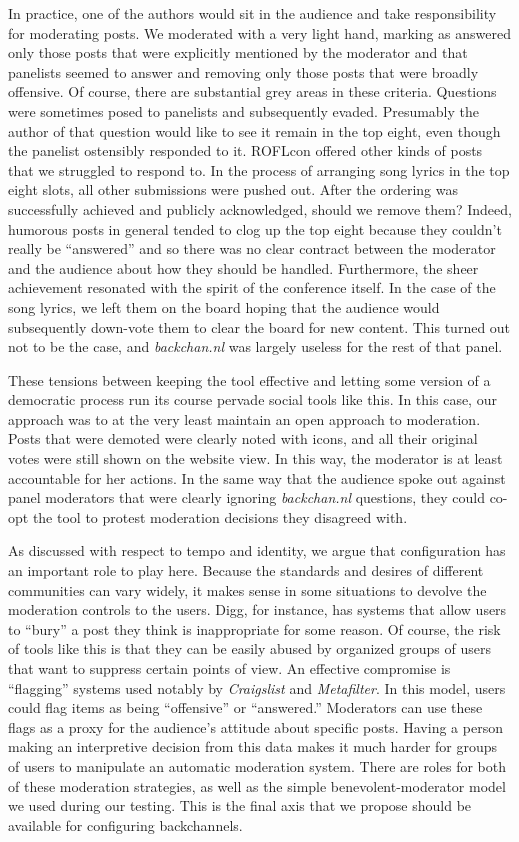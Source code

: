 In practice, one of the authors would sit in the audience and take responsibility for moderating posts. We moderated with a very light hand, marking as answered only those posts that were explicitly mentioned by the moderator and that panelists seemed to answer and removing only those posts that were broadly offensive. Of course, there are substantial grey areas in these criteria. Questions were sometimes posed to panelists and subsequently evaded. Presumably the author of that question would like to see it remain in the top eight, even though the panelist ostensibly responded to it. ROFLcon offered other kinds of posts that we struggled to respond to. In the process of arranging song lyrics in the top eight slots, all other submissions were pushed out. After the ordering was successfully achieved and publicly acknowledged, should we remove them? Indeed, humorous posts in general tended to clog up the top eight because they couldn't really be ``answered'' and so there was no clear contract between the moderator and the audience about how they should be handled. Furthermore, the sheer achievement resonated with the spirit of the conference itself. In the case of the song lyrics, we left them on the board hoping that the audience would subsequently down-vote them to clear the board for new content. This turned out not to be the case, and \emph{backchan.nl} was largely useless for the rest of that panel.

These tensions between keeping the tool effective and letting some version of a democratic process run its course pervade social tools like this. In this case, our approach was to at the very least maintain an open approach to moderation. Posts that were demoted were clearly noted with icons, and all their original votes were still shown on the website view. In this way, the moderator is at least accountable for her actions. In the same way that the audience spoke out against panel moderators that were clearly ignoring \emph{backchan.nl} questions, they could co-opt the tool to protest moderation decisions they disagreed with.

As discussed with respect to tempo and identity, we argue that configuration has an important role to play here. Because the standards and desires of different communities can vary widely, it makes sense in some situations to devolve the moderation controls to the users. Digg, for instance, has systems that allow users to ``bury'' a post they think is inappropriate for some reason. Of course, the risk of tools like this is that they can be easily abused by organized groups of users that want to suppress certain points of view. An effective compromise is ``flagging'' systems used notably by \emph{Craigslist} and \emph{Metafilter}. In this model, users could flag items as being ``offensive'' or ``answered.'' Moderators can use these flags as a proxy for the audience's attitude about specific posts. Having a person making an interpretive decision from this data makes it much harder for groups of users to manipulate an automatic moderation system. There are roles for both of these moderation strategies, as well as the simple benevolent-moderator model we used during our testing. This is the final axis that we propose should be available for configuring backchannels. 


